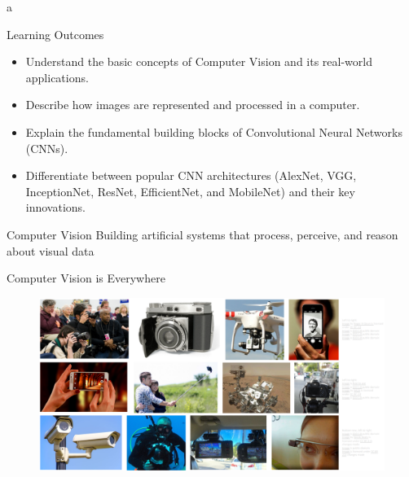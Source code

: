 a\documentclass[10pt]{beamer}
\theoremstyle{remark}
\theoremstyle{definition}
\begin{document}
\begin{frame}{Learning Outcomes}
\begin{itemize}
    \item Understand the basic concepts of Computer Vision and its real-world applications.
    \item Describe how images are represented and processed in a computer.
    \item Explain the fundamental building blocks of Convolutional Neural Networks (CNNs).
    \item Differentiate between popular CNN architectures (AlexNet, VGG, InceptionNet, ResNet, EfficientNet, and MobileNet) and their key innovations.
\end{itemize}
\end{frame}



\begin{frame}{Computer Vision}
\centering
Building artificial systems that process, perceive, and reason about visual data

    
\end{frame}

\begin{frame}{Computer Vision is Everywhere}
\begin{figure}
\centering
\includegraphics[width=1.0\textwidth,height=1.0\textheight,keepaspectratio]{./images/cv_1.png}
\end{figure}
    
\end{frame}
\end{document}
